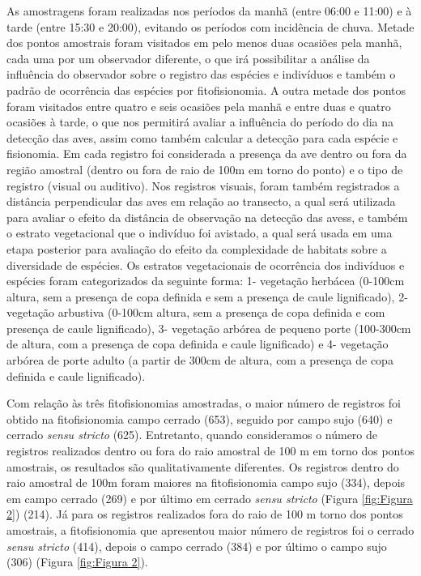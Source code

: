 As amostragens foram realizadas nos períodos da manhã (entre 06:00 e 11:00) e à tarde (entre 15:30 e 20:00), evitando os períodos com incidência de chuva. Metade dos pontos amostrais foram visitados em pelo menos duas ocasiões pela manhã, cada uma por um observador diferente, o que irá possibilitar a análise da influência do observador sobre o registro das espécies e indivíduos e também o padrão de ocorrência das espécies por fitofisionomia. A outra metade dos pontos foram visitados entre quatro e seis ocasiões pela manhã e entre duas e quatro ocasiões à tarde, o que nos permitirá avaliar a influência do período do dia na detecção das aves, assim como também calcular a detecção para cada espécie e fisionomia. Em cada registro foi considerada a presença da ave dentro ou fora da região amostral (dentro ou fora de raio de 100m em torno do ponto) e o tipo de registro (visual ou auditivo). Nos registros visuais, foram também registrados a distância perpendicular das aves em relação ao transecto, a qual será utilizada para avaliar o efeito da distância de observação na detecção das avess, e também o estrato vegetacional que o indivíduo foi avistado, a qual será usada em uma etapa posterior para avaliação do efeito da complexidade de habitats sobre a diversidade de espécies. Os estratos vegetacionais de ocorrência dos indivíduos e espécies foram categorizados da seguinte forma: 1- vegetação herbácea (0-100cm altura, sem a presença de copa definida e sem a presença de caule lignificado), 2- vegetação arbustiva (0-100cm altura, sem a presença de copa definida e com presença de caule lignificado), 3- vegetação arbórea de pequeno porte (100-300cm de altura, com a presença de copa definida e caule lignificado) e 4- vegetação arbórea de porte adulto (a partir de 300cm de altura, com a presença de copa definida e caule lignificado).

Com relação às três fitofisionomias amostradas, o maior número de registros foi obtido na fitofisionomia campo cerrado (653), seguido por campo sujo (640) e cerrado \textit{sensu stricto} (625). Entretanto, quando consideramos o número de registros realizados dentro ou fora do raio amostral de 100 m em torno dos pontos amostrais, os resultados são qualitativamente diferentes.
Os registros dentro do raio amostral de 100m foram maiores na fitofisionomia campo sujo (334), depois em campo cerrado (269) e por último em cerrado \textit{sensu stricto} (Figura \ref{fig:Figura 2}) (214). Já para os registros realizados fora do raio de 100 m torno dos pontos amostrais, a fitofisionomia que apresentou maior número de registros foi o cerrado \textit{sensu stricto} (414), depois o campo cerrado (384) e por último o campo sujo (306) (Figura \ref{fig:Figura 2}).

